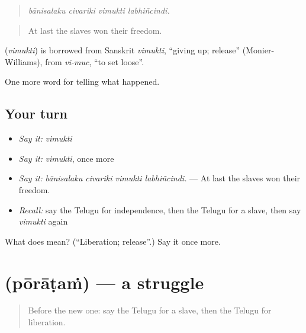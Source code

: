 \begin{quote}
\emph{bānisalaku civariki vimukti labhiñcindi.}
\end{quote}

\begin{quote}
At last the slaves won their freedom.
\end{quote}

\begin{cousinweb}
\textbf{} (\emph{vimukti}) is borrowed from Sanskrit \emph{vimukti}, \textquotedblleft{}giving up; release\textquotedblright{} (Monier-Williams), from \emph{vi-muc}, \textquotedblleft{}to set loose\textquotedblright{}.
\end{cousinweb}

\begin{grammarlens}[title={What you've built}]
One more word for telling what happened.
\end{grammarlens}

\subsection*{Your turn}
\begin{itemize}
\raggedright
  \item \emph{Say it:} \emph{vimukti}
  \item \emph{Say it:} \emph{vimukti}, once more
  \item \emph{Say it:} \emph{bānisalaku civariki vimukti labhiñcindi.} — At last the slaves won their freedom.
  \item \emph{Recall:} say the Telugu for independence, then the Telugu for a slave, then say \emph{vimukti} again
\end{itemize}

\begin{tcolorbox}[breakable,colback=teal!4,colframe=teal!35!black,title={Before you move on}]
What does  mean? (\textquotedblleft{}Liberation; release\textquotedblright{}.) Say it once more.
\end{tcolorbox}
\section[\texorpdfstring{\te{పోరాటం} (pōrāṭaṁ)}{పోరాటం (pōrāṭaṁ)}]{ (pōrāṭaṁ) — a struggle}

\label{lesson:TE-C364-poratam}



\begin{quote}
Before the new one: say the Telugu for a slave, then the Telugu for liberation.
\end{quote}

